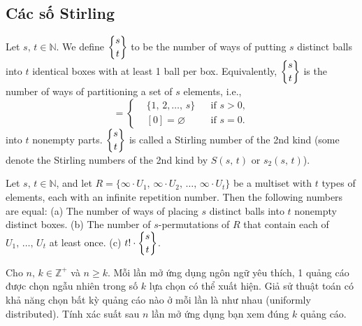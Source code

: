 \subsection{Các số Stirling}
\begin{dinhnghia}\label{def: stirling 2}
    Let $s,\,t\in\mathbb{N}$. We define $\displaystyle\stirlingII{s}{t}$ to be the number of ways of putting $s$ distinct balls into $t$ identical boxes with at least 1 ball per box. Equivalently, $\displaystyle\stirlingII{s}{t}$ is the number of ways of partitioning a set of $s$ elements, i.e.,
\begin{equation*}
    [s] = \left\{\begin{split}
        &\{1,\,2,\ldots,\,s\}&&\mbox{if } s > 0,\\
        &[0] = \varnothing&&\mbox{if } s = 0.
    \end{split}\right.
\end{equation*}
into $t$ nonempty parts. $\displaystyle\stirlingII{s}{t}$ is called a {\rm Stirling number of the 2nd kind} (some denote the Stirling numbers of the 2nd kind by $S(s,\,t)$ or $s_2(s,\,t)$).
\end{dinhnghia}

\begin{dinhly}\label{thm: stirling 2: multiset} 
    Let $s,\,t\in\mathbb{N}$, and let $R = \{\infty\cdot U_1,\,\infty\cdot U_2,\,\ldots,\,\infty\cdot U_t\}$ be a multiset with $t$ types of elements, each with an infinite repetition number. Then the following numbers are equal: (a) The number of ways of placing $s$ distinct balls into $t$ nonempty distinct boxes. (b) The number of $s$-permutations of $R$ that contain each of $U_1,\,\ldots,\,U_t$ at least once. (c) $\displaystyle t!\cdot \stirlingII{s}{t}$.
\end{dinhly}

\begin{tcolorbox}[breakable]
    \begin{baitoan}\label{pb:w05:02}
        Cho $n,\,k\in \mathbb{Z^+}$ và $n \geq k$. Mỗi lần mở ứng dụng ngôn ngữ yêu thích, 1 quảng cáo được chọn ngẫu nhiên trong số $k$ lựa chọn có thể xuất hiện. Giả sử thuật toán có khả năng chọn bất kỳ quảng cáo nào ở mỗi lần là như nhau (uniformly distributed). Tính xác suất sau $n$ lần mở ứng dụng bạn xem đúng $k$ quảng cáo.
    \end{baitoan}
\end{tcolorbox}

